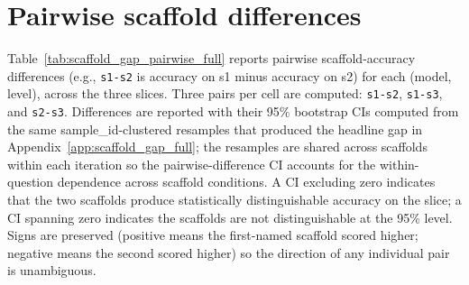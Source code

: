 \documentclass[10pt]{article} %
\begin{document}
\section{Pairwise scaffold differences}\label{app:scaffold_gap_pairwise}

    Table~\ref{tab:scaffold_gap_pairwise_full} reports pairwise scaffold-accuracy differences (e.g., \texttt{s1-s2} is accuracy on s1 minus accuracy on s2) for each (model, level), across the three slices. Three pairs per cell are computed: \texttt{s1-s2}, \texttt{s1-s3}, and \texttt{s2-s3}. Differences are reported with their 95\% bootstrap CIs computed from the same sample\_id-clustered resamples that produced the headline gap in Appendix~\ref{app:scaffold_gap_full}; the resamples are shared across scaffolds within each iteration so the pairwise-difference CI accounts for the within-question dependence across scaffold conditions. A CI excluding zero indicates that the two scaffolds produce statistically distinguishable accuracy on the slice; a CI spanning zero indicates the scaffolds are not distinguishable at the 95\% level. Signs are preserved (positive means the first-named scaffold scored higher; negative means the second scored higher) so the direction of any individual pair is unambiguous.
\end{document}
